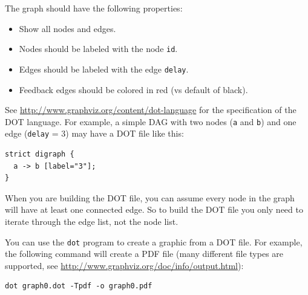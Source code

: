 The graph should have the following properties:
\begin{itemize}
	\item Show all nodes and edges.
	\item Nodes should be labeled with the node {\tt id}.
	\item Edges should be labeled with the edge {\tt delay}.
	\item Feedback edges should be colored in red (vs default of black).
\end{itemize}

See \url{http://www.graphviz.org/content/dot-language} for the specification of the DOT language.  For example, a simple DAG with two nodes ({\tt a} and {\tt b}) and one edge ({\tt delay} = 3) may have a DOT file like this:

\begin{lstlisting}
strict digraph {
  a -> b [label="3"];
}
\end{lstlisting}
When you are building the DOT file, you can assume every node in the graph will have at least one connected edge.  So to build the DOT file you only need to iterate through the edge list, not the node list.


You can use the {\tt dot} program to create a graphic from a DOT file.  For example, the following command will create a PDF file (many different file types are supported, see \url{http://www.graphviz.org/doc/info/output.html}):
\begin{lstlisting}
dot graph0.dot -Tpdf -o graph0.pdf
\end{lstlisting}

